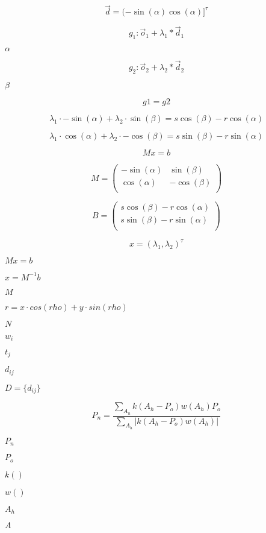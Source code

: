 \documentclass{article}
\begin{document}
\[ \vec{d} = ( -\sin(\alpha) \cos(\alpha) ]^{\tau} \]
\pagebreak

\[ g_1: \vec{o}_1+ \lambda_1 * \vec{d}_1 \]
\pagebreak

$\alpha$
\pagebreak

\[ g_2: \vec{o}_2+ \lambda_2 * \vec{d}_2 \]
\pagebreak

$\beta$
\pagebreak

\[ g1 = g2 \]
\pagebreak

\[ \lambda_1\cdot -\sin(\alpha) + \lambda_2 \cdot \sin(\beta) = s\cos(\beta) - r\cos(\alpha) \]
\pagebreak

\[ \lambda_1\cdot \cos(\alpha) + \lambda_2 \cdot -\cos(\beta) = s\sin(\beta) - r\sin(\alpha) \]
\pagebreak

\[ Mx = b \]
\pagebreak

\[ M = \left( \begin{array}{cc} -\sin(\alpha) & \sin(\beta) \\ \cos(\alpha) & -\cos(\beta) \\ \end{array} \right) \]
\pagebreak

\[ B = \left( \begin{array}{c} s\cos(\beta) - r\cos(\alpha) \\ s\sin(\beta) - r\sin(\alpha) \\ \end{array} \right) \]
\pagebreak

\[ x = (\lambda_1, \lambda_2)^{\tau} \]
\pagebreak

$ Mx=b $
\pagebreak

$x=M^{-1}b$
\pagebreak

$M$
\pagebreak

$r = x\cdot cos(rho) + y\cdot sin(rho)$
\pagebreak

$N$
\pagebreak

$w_i$
\pagebreak

$t_j$
\pagebreak

$d_{ij}$
\pagebreak

$D=\{d_{ij}\}$
\pagebreak

\[P_n = \frac{\sum_{A_h}k(A_h-P_o)w(A_h)P_o}{\sum_{A_h} | k(A_h-P_o) w(A_h)|} \]
\pagebreak

$P_n $
\pagebreak

$P_o $
\pagebreak

$k() $
\pagebreak

$w() $
\pagebreak

$A_h $
\pagebreak

$A$
\pagebreak
\end{document}
